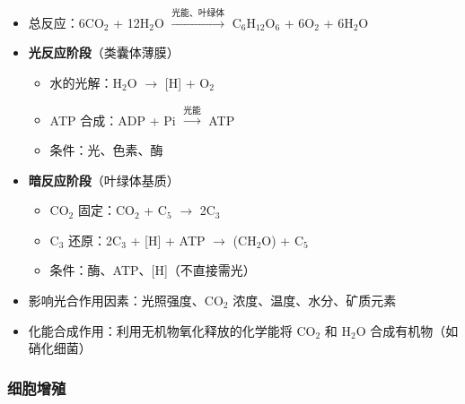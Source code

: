 \begin{itemize}
  \item 总反应：6CO$_2$ + 12H$_2$O $\xrightarrow{\text{光能、叶绿体}}$ C$_6$H$_{12}$O$_6$ + 6O$_2$ + 6H$_2$O
  \item \textbf{光反应阶段}（类囊体薄膜）
  \begin{itemize}
    \item 水的光解：H$_2$O $\to$ [H] + O$_2$
    \item ATP 合成：ADP + Pi $\xrightarrow{\text{光能}}$ ATP
    \item 条件：光、色素、酶
  \end{itemize}
  \item \textbf{暗反应阶段}（叶绿体基质）
  \begin{itemize}
    \item CO$_2$ 固定：CO$_2$ + C$_5$ $\to$ 2C$_3$
    \item C$_3$ 还原：2C$_3$ + [H] + ATP $\to$ (CH$_2$O) + C$_5$
    \item 条件：酶、ATP、[H]（不直接需光）
  \end{itemize}
  \item 影响光合作用因素：光照强度、CO$_2$ 浓度、温度、水分、矿质元素
  \item 化能合成作用：利用无机物氧化释放的化学能将 CO$_2$ 和 H$_2$O 合成有机物（如硝化细菌）
\end{itemize}

\subsubsection{细胞增殖}

